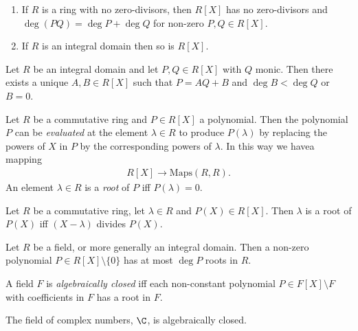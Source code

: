 \documentclass{article}
\begin{document}
\begin{lemma}
	\begin{enumerate}
		\item If $R$ is a ring with no zero-divisors, then $R[X]$ has no zero-divisors
		      and $\deg(PQ)=\deg P + \deg Q$ for non-zero $P,Q\in R[X]$.
		\item If $R$ is an integral domain then so is $R[X]$.
	\end{enumerate}
\end{lemma}

\begin{theorem}[Theorem 3.3.4]
	Let $R$ be an integral domain and let $P,Q\in R[X]$ with $Q$ monic. Then there exists
	a unique $A,B\in R[X]$ such that $P=AQ+B$ and $\deg B<\deg Q$ or $B=0$.
\end{theorem}

\begin{definition}
	Let $R$ be a commutative ring and $P\in R[X]$ a polynomial. Then the polynomial $P$
	can be \emph{evaluated} at the element $\lambda\in R$ to produce $P(\lambda)$
	by replacing the powers of $X$ in $P$ by the corresponding powers of $\lambda$.
	In this way we havea mapping
	\begin{align*}
		R[X] \to \text{Maps}(R,R).
	\end{align*}
	An element $\lambda\in R$ is a \emph{root} of $P$ iff $P(\lambda) = 0$.
\end{definition}

\begin{proposition}[Proposition 3.3.9]
	Let $R$ be a commutative ring, let $\lambda\in R$ and $P(X)\in R[X]$. Then $\lambda$
	is a root of $P(X)$ iff $(X-\lambda)$ divides $P(X)$.
\end{proposition}

\begin{theorem}[Theorem 3.3.10]
	Let $R$ be a field, or more generally an integral domain. Then a non-zero polynomial
	$P\in R[X]\setminus\{0\}$ has at most $\deg P$ roots in $R$.
\end{theorem}

\begin{definition}
	A field $F$ is \emph{algebraically closed} iff each non-constant polynomial $P\in F[X]\setminus F$
	with coefficients in $F$ has a root in $F$.
\end{definition}

\begin{theorem}
	The field of complex numbers, $\C$, is algebraically closed.
\end{theorem}
\end{document}
